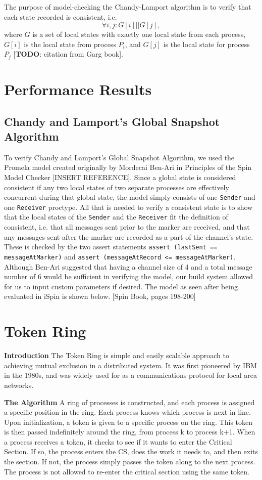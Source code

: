 \documentclass[12pt]{article}
\begin{document}
\begin{flushleft}
The purpose of model-checking the Chandy-Lamport algorithm is to verify that each state recorded is consistent, i.e. $$\forall i,j:G[i]||G[j],$$ where $G$ is a set of local states with exactly one local state from each process, $G[i]$ is the local state from process $P_i$, and $G[j]$ is the local state for process $P_j$ [\textbf{TODO}: citation from Garg book].

\section{Performance Results}
\subsection{Chandy and Lamport's Global Snapshot Algorithm}
To verify Chandy and Lamport's Global Snapshot Algorithm, we used the Promela model created originally by Mordecai Ben-Ari in Principles of the Spin Model Checker [INSERT REFERENCE]. Since a global state is considered consistent if any two local states of two separate processes are effectively concurrent during that global state, the model simply consists of one \texttt{Sender} and one \texttt{Receiver} proctype. All that is needed to verify a consistent state is to show that the local states of the \texttt{Sender} and the \texttt{Receiver} fit the definition of consistent, i.e. that all messages sent prior to the marker are received, and that any messages sent after the marker are recorded as a part of the channel's state. These is checked by the two assert statements \texttt{assert (lastSent == messageAtMarker)} and \texttt{assert (messageAtRecord <= messageAtMarker)}. Although Ben-Ari suggested that having a channel size of 4 and a total message number of 6 would be sufficient in verifying the model, our build system allowed for us to input custom parameters if desired. The model as seen after being evaluated in iSpin is shown below.
[Spin Book, pages 198-200]

\section{Token Ring}
\textbf{Introduction}
\newline
The Token Ring is simple and easily scalable approach to achieving mutual exclusion in a distributed system. It was first pioneered by IBM in the 1980s, and was widely used for as a communications protocol for local area networks. 

\textbf{The Algorithm}
\newline
A ring of processes is constructed, and each process is assigned a specific position in the ring. Each process knows which process is next in line. Upon initialization, a token is given to a specific process on the ring. This token is then passed indefinitely around the ring, from process k to process k+1. 
When a process receives a token, it checks to see if it wants to enter the Critical Section. If so, the process enters the CS, does the work it needs to, and then exits the section. If not, the process simply passes the token along to the next process. The process is not allowed to re-enter the critical section using the same token. 


\end{flushleft}
\end{document}
